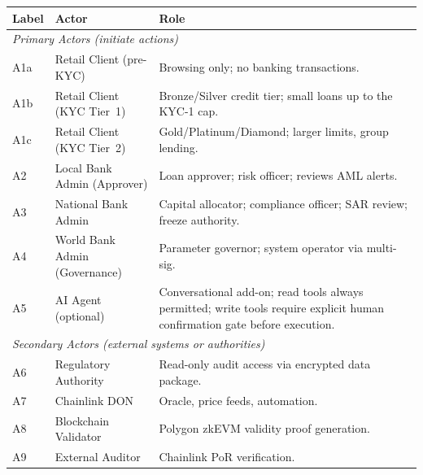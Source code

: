 \documentclass[12pt,a4paper]{report}
\newcommand{\tableheadcolor}{\rowcolor{TableHeadBg}}
\begin{document}
\begin{table}[H]
\centering
\begin{tabular}{p{1.2cm}p{4.2cm}p{7.9cm}}
\toprule
\tableheadcolor
\textbf{Label} & \textbf{Actor} & \textbf{Role} \\
\midrule
\multicolumn{3}{l}{\textit{Primary Actors (initiate actions)}} \\
A1a & Retail Client (pre-KYC) & Browsing only; no banking transactions. \\
A1b & Retail Client (KYC Tier~1) & Bronze/Silver credit tier; small loans up to the KYC-1 cap. \\
A1c & Retail Client (KYC Tier~2) & Gold/Platinum/Diamond; larger limits, group lending. \\
A2 & Local Bank Admin (Approver) & Loan approver; risk officer; reviews AML alerts. \\
A3 & National Bank Admin & Capital allocator; compliance officer; SAR review; freeze authority. \\
A4 & World Bank Admin (Governance) & Parameter governor; system operator via multi-sig. \\
A5 & AI Agent (optional) & Conversational add-on; read tools always permitted; write tools require explicit human confirmation gate before execution. \\
\multicolumn{3}{l}{\textit{Secondary Actors (external systems or authorities)}} \\
A6 & Regulatory Authority & Read-only audit access via encrypted data package. \\
A7 & Chainlink DON & Oracle, price feeds, automation. \\
A8 & Blockchain Validator & Polygon zkEVM validity proof generation. \\
A9 & External Auditor & Chainlink PoR verification. \\
\bottomrule
\end{tabular}
\end{table}
\end{document}
